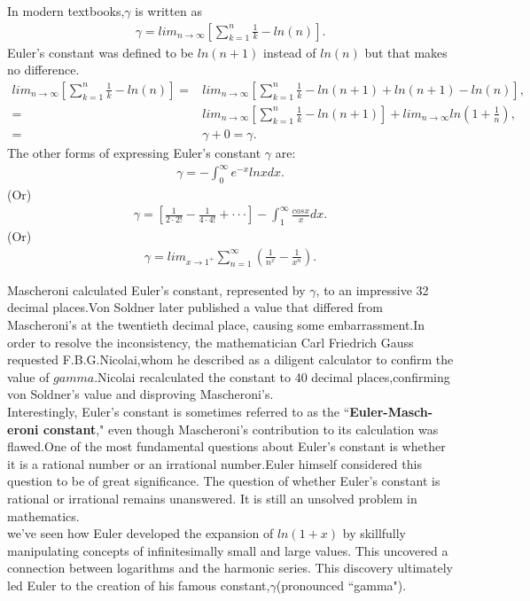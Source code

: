 \documentclass[a4paper,reqno,11pt]{book}
\theoremstyle{plain}%
\theoremstyle{definition}
\begin{document}
In modern textbooks,$\gamma$ is written as
\begin{eqnarray*}
    \gamma=lim_{n\to\infty}\left[\sum_{k=1}^{n}\frac{1}{k}-ln(n)\right].
\end{eqnarray*}
Euler's constant was defined to be $ln(n+1)$ instead of $ln(n)$ but that makes no difference.
\begin{align*}
lim_{n\to\infty}\left[\sum_{k=1}^{n}\frac{1}{k}-ln(n)\right]=&lim_{n\to\infty}\left[\sum_{k=1}^{n}\frac{1}{k}-ln(n+1)+ln(n+1)-ln(n)\right],\\
=&lim_{n\to\infty}\left[\sum_{k=1}^{n}\frac{1}{k}-ln(n+1)\right]+lim_{n\to\infty}ln\left(1+\frac{1}{n}\right),\\
=&\gamma+0=\gamma.
\end{align*}
The other forms of expressing Euler's constant $\gamma$ are\cite{ref4}:\\
\begin{eqnarray*}
    \gamma=-\int_{0}^{\infty}e^{-x}lnxdx.
\end{eqnarray*}
(Or)
\begin{eqnarray*}
    \gamma=\left[\frac{1}{2\cdot2!}-\frac{1}{4\cdot4!}+\cdot\cdot\cdot\right]-\int_{1}^{\infty}\frac{cosx}{x}dx.
\end{eqnarray*}
(Or)
\begin{eqnarray*}
    \gamma=lim_{x\to1^+}\sum_{n=1}^{\infty}\left(\frac{1}{n^x}-\frac{1}{x^n}\right).
\end{eqnarray*}

Mascheroni calculated Euler's constant, represented by $\gamma$, to an impressive 32 decimal places.Von Soldner later published a value that differed from Mascheroni's at the twentieth decimal place, causing some embarrassment.In order to resolve the inconsistency, the mathematician Carl Friedrich Gauss requested F.B.G.Nicolai,whom he described as a diligent calculator to confirm the value of $gamma$.Nicolai recalculated the constant to 40 decimal places,confirming von Soldner's value and disproving Mascheroni's.\\
Interestingly, Euler's constant is sometimes referred to as the ``\textbf{Euler-Masch- eroni constant}," even though Mascheroni's contribution to its calculation was flawed.One of the most fundamental questions about Euler's constant is whether it is a rational number or an irrational number.Euler himself considered this question to be of great significance. The question of whether Euler's constant is rational or irrational remains unanswered. It is still an unsolved problem in mathematics.\\
we've seen how Euler developed the expansion of $ln(1 + x)$ by skillfully manipulating concepts of infinitesimally small and large values. This uncovered a connection between logarithms and the harmonic series. This discovery ultimately led Euler to the creation of his famous constant,$\gamma$(pronounced ``gamma").
\end{document}

